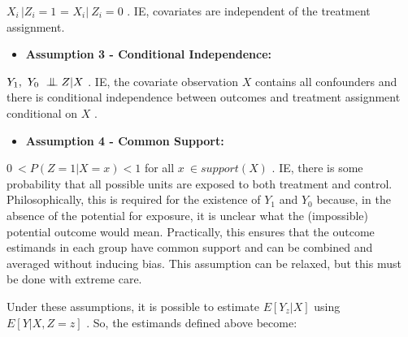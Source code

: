 \documentclass[../main.tex]{subfiles}
\begin{document}
\begin{adjustwidth}{0.5in}{0.0in}
\( X_{i~}  \vert  Z_{i}=1 \) \textbf{ }=  \( X_{i}  \vert ~Z_{i}=0 \) . IE, covariates are independent of the treatment assignment.\par
\end{adjustwidth}

\vspace{\baselineskip}
\begin{itemize}
    \item \textbf{Assumption 3 - Conditional Independence:}
\end{itemize}\par

\begin{adjustwidth}{0.5in}{0.0in}
 \( Y_{1},~Y_{0} ~ \bigCI Z  \vert  X \) . IE, the covariate observation  \( X \) contains all confounders and there is conditional independence between outcomes and treatment assignment conditional on  \( X \) .\par

\end{adjustwidth}


\vspace{\baselineskip}
\begin{itemize}
    \item \textbf{Assumption 4 - Common Support:}
\end{itemize}\par

\begin{adjustwidth}{0.5in}{0.0in}
 \( 0~< P \left( Z=1   \vert  X = x \right)  < 1 \) for all  \( x~ \in support \left( X \right)  \) . IE, there is some probability that all possible units are exposed to both treatment and control. Philosophically, this is required for the existence of  \( Y_{1} \) and  \( Y_{0} \) because, in the absence of the potential for exposure, it is unclear what the (impossible) potential outcome would mean. Practically, this ensures that the outcome estimands in each group have common support and can be combined and averaged without inducing bias. This assumption can be relaxed, but this must be done with extreme care.\par

\end{adjustwidth}


\vspace{\baselineskip}
Under these assumptions, it is possible to estimate  \( E \left[ Y_{z}  \vert  X \right]  \) using  \( E \left[ Y  \vert  X, Z=z \right]  \) . So, the estimands defined above become:\par
\end{document}
